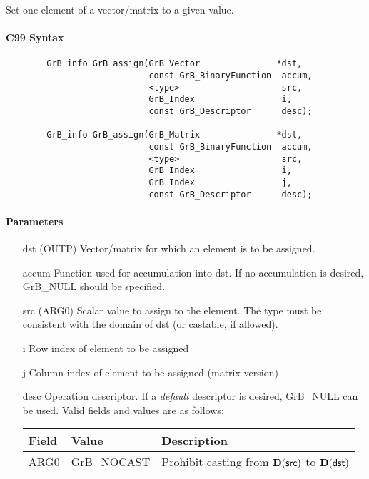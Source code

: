 Set one element of a vector/matrix to a given value.

\paragraph{C99 Syntax}

\begin{verbatim}
        GrB_info GrB_assign(GrB_Vector               *dst,
                            const GrB_BinaryFunction  accum,
                            <type>                    src,
                            GrB_Index                 i,
                            const GrB_Descriptor      desc); 

        GrB_info GrB_assign(GrB_Matrix               *dst,
                            const GrB_BinaryFunction  accum,
                            <type>                    src,
                            GrB_Index                 i,
                            GrB_Index                 j,
                            const GrB_Descriptor      desc); 
\end{verbatim}

\paragraph{Parameters}

\begin{itemize}[leftmargin=1.1in]
    \item[{\sf dst}]   ({\sf OUTP}) Vector/matrix for which an element is to be assigned.

    \item[{\sf accum}] Function used for accumulation into {\sf dst}.  If no accumulation
                        is desired, {\sf GrB\_NULL} should be specified.

    \item[{\sf src}]   ({\sf ARG0}) Scalar value to assign to the element.  The type must
                              be consistent with the domain of dst (or castable, if allowed).
    \item[{\sf i}]     Row index of element to be assigned
    \item[{\sf j}]     Column index of element to be assigned (matrix version)

    \item[{\sf desc}]   Operation descriptor. If a
    \emph{default} descriptor is desired, {\sf GrB\_NULL} can be
    used. Valid fields and values are as follows: \\
    \begin{tabular}{lll}
    Field  & Value & Description \\
    \hline
    {\sf ARG0} & {\sf GrB\_NOCAST} & Prohibit casting from $\bold{D}({\sf src})$ to $\bold{D}({\sf dst})$ \\
    \end{tabular}

\end{itemize}

